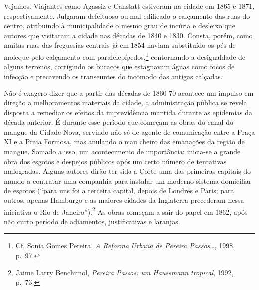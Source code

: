 Vejamos. Viajantes como Agassiz e Canstatt estiveram na cidade em 1865 e
1871, respectivamente. Julgaram defeituoso ou mal edificado o calçamento
das ruas do centro, atribuindo à municipalidade o mesmo grau de incúria
e desleixo que autores que visitaram a cidade nas décadas de 1840 e
1830. Consta, porém, como muitas ruas das freguesias centrais já em 1854
haviam substituído os pés-de-moleque pelo calçamento com
paralelepípedos,\footnote{Cf. Sonia Gomes Pereira, \textit{A Reforma
  Urbana de Pereira Passos}\ldots{}, 1998, p.~97.} contornando a
desigualdade de alguns terrenos, corrigindo os buracos que estagnavam
águas como focos de infecção e precavendo os transeuntes do incômodo das
antigas calçadas.

Não é exagero dizer que a partir das décadas de 1860-70 acontece um
impulso em direção a melhoramentos materiais da cidade, a administração
pública se revela disposta a remediar os efeitos da imprevidência
mantida durante as epidemias da década anterior. É durante esse período
que começam as obras do canal do mangue da Cidade Nova, servindo não só
de agente de comunicação entre a Praça XI e a Praia Formosa, mas
anulando o mau cheiro das emanações da região de mangue. Somado a isso,
um acontecimento de importância: inicia-se a grande obra dos esgotos e
despejos públicos após um certo número de tentativas malogradas. Alguns
autores dirão ter sido a Corte uma das primeiras capitais do mundo a
contratar uma companhia para instalar um moderno sistema domiciliar de
esgotos (``para uns foi a terceira capital, depois de Londres e Paris;
para outros, apenas Hamburgo e as maiores cidades da Inglaterra
precederam nessa iniciativa o Rio de Janeiro'').\footnote{Jaime Larry
  Benchimol, \textit{Pereira Passos: um Haussmann tropical}, 1992, p.~73.}
As obras começam a sair do papel em 1862, após não curto período de
adiamentos, justificativas e laranjas.

